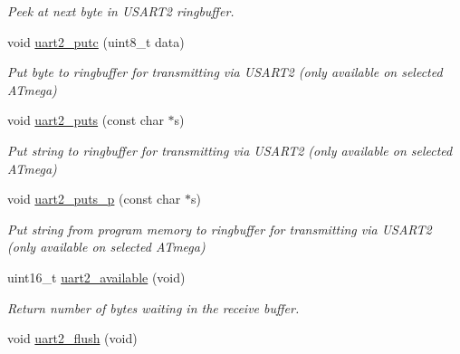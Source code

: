 \begin{DoxyCompactItemize}
\begin{DoxyCompactList}\small\item\em Peek at next byte in U\-S\-A\-R\-T2 ringbuffer. \end{DoxyCompactList}\item 
void \hyperlink{group__avr-uart_gab16a85e4f634fd77fb43ed8747ed119c}{uart2\-\_\-putc} (uint8\-\_\-t data)
\begin{DoxyCompactList}\small\item\em Put byte to ringbuffer for transmitting via U\-S\-A\-R\-T2 (only available on selected A\-Tmega) \end{DoxyCompactList}\item 
void \hyperlink{group__avr-uart_ga2bd69cbc0e1c8b8343ceae0466889218}{uart2\-\_\-puts} (const char $\ast$s)
\begin{DoxyCompactList}\small\item\em Put string to ringbuffer for transmitting via U\-S\-A\-R\-T2 (only available on selected A\-Tmega) \end{DoxyCompactList}\item 
void \hyperlink{group__avr-uart_ga827c36b80bba4bee87fdda34efa327b8}{uart2\-\_\-puts\-\_\-p} (const char $\ast$s)
\begin{DoxyCompactList}\small\item\em Put string from program memory to ringbuffer for transmitting via U\-S\-A\-R\-T2 (only available on selected A\-Tmega) \end{DoxyCompactList}\item 
\hypertarget{group__avr-uart_ga07c846344e698ef12323da238152990b}{uint16\-\_\-t \hyperlink{group__avr-uart_ga07c846344e698ef12323da238152990b}{uart2\-\_\-available} (void)}\label{group__avr-uart_ga07c846344e698ef12323da238152990b}

\begin{DoxyCompactList}\small\item\em Return number of bytes waiting in the receive buffer. \end{DoxyCompactList}\item 
\hypertarget{group__avr-uart_gade8eed43df7ad1387c4bfa916c972abd}{void \hyperlink{group__avr-uart_gade8eed43df7ad1387c4bfa916c972abd}{uart2\-\_\-flush} (void)}\label{group__avr-uart_gade8eed43df7ad1387c4bfa916c972abd}


\end{DoxyCompactItemize}
